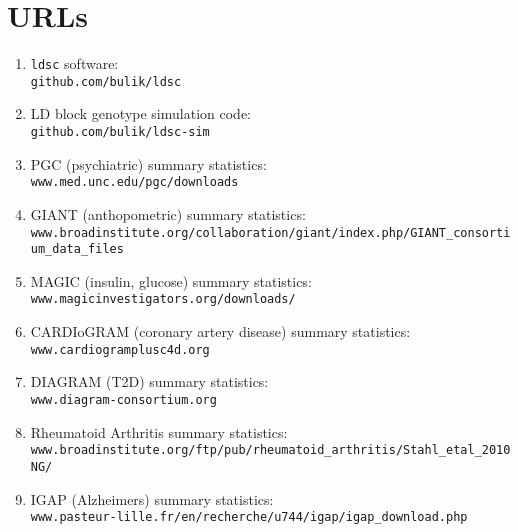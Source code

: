 \documentclass[11pt]{article}
\numberwithin{equation}{section}
\begin{document}
\newpage
%


\section{URLs}\label{URLs}

\begin{enumerate}
	\item \texttt{ldsc} software:\\ 
		\texttt{github.com/bulik/ldsc}
		
	\item LD block genotype simulation code:\\
		\texttt{github.com/bulik/ldsc-sim}
		
	\item PGC (psychiatric) summary statistics:\\ 
		\texttt{www.med.unc.edu/pgc/downloads}
		
	\item GIANT (anthopometric) summary statistics: \\
		\texttt{www.broadinstitute.org/collaboration/giant/index.php/GIANT\_consortium\_data\_files}
		
	\item MAGIC (insulin, glucose) summary statistics: \\
		\texttt{www.magicinvestigators.org/downloads/}
		
	\item CARDIoGRAM (coronary artery disease) summary statistics:\\	
		\texttt{www.cardiogramplusc4d.org}
	
	\item DIAGRAM (T2D) summary statistics:\\
		\texttt{www.diagram-consortium.org}
		
	\item Rheumatoid Arthritis summary statistics:\\
		\texttt{www.broadinstitute.org/ftp/pub/rheumatoid\_arthritis/Stahl\_etal\_2010NG/}
	
	\item IGAP (Alzheimers) summary statistics:\\
		\texttt{www.pasteur-lille.fr/en/recherche/u744/igap/igap\_download.php}


\end{enumerate}
\end{document}
